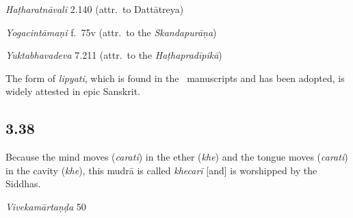 \begin{ekdosis}
\begin{testimonia}[hp03_037]
\emph{Haṭharatnāvalī} 2.140 (attr.~to Dattātreya)
\begin{versinnote}
\end{versinnote}

\emph{Yogacintāmaṇi} f.~75v (attr.~to the \emph{Skandapurāṇa})
\begin{versinnote}
\end{versinnote}

\emph{Yuktabhavadeva} 7.211 (attr.~to the \emph{Haṭhapradīpikā})
\begin{versinnote}
\end{versinnote}
\end{testimonia}

\begin{philcomm}[hp03_037]
The form of \emph{lipyati}, which is found in the \textalpha\ manuscripts and has been adopted, is widely attested in epic Sanskrit.
\end{philcomm}

\subsection*{3.38}
\begin{translation}[hp03_038]
Because the mind moves (\emph{carati}) in the ether (\emph{khe}) and the tongue moves (\emph{carati}) in the cavity (\emph{khe}), this mudrā is called \emph{khecarī} [and] is worshipped by the Siddhas.
\end{translation}

\begin{sources}[hp03_038]
\emph{Vivekamārtaṇḍa} 50
\begin{versinnote}
\tl{\var{37c tenaiṣā ] tenaiva, teneyaṃ \vl 37cd nāma mudrā ] mudrā sarva° \vl}\\!}
\end{versinnote}
\end{sources}


\end{ekdosis}
